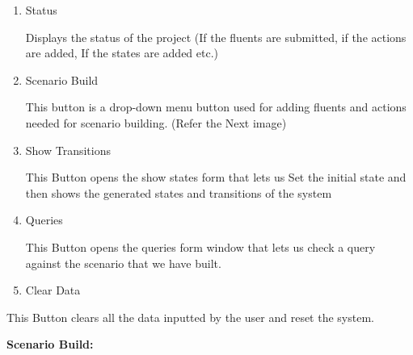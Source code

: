 \documentclass[12pt]{article}
\begin{document}
\vspace{\baselineskip}
\begin{enumerate}
	\item Status\par

\tab Displays the status of the project (If the fluents are submitted, if the actions are \tab added, If the states are added etc.)\par


\vspace{\baselineskip}
	\item Scenario Build\par

\tab This button is a drop-down menu button used for adding fluents and actions needed \tab for scenario building. (Refer the Next image)\par


\vspace{\baselineskip}
	\item Show Transitions\par

\tab This Button opens the show states form that lets us Set the initial state and then shows \tab the generated states and transitions of the system\par


\vspace{\baselineskip}
	\item Queries\par

\tab This Button opens the queries form window that lets us check a query against the \tab scenario that we have built.\par


\vspace{\baselineskip}
	\item Clear Data
\end{enumerate}\par

This Button clears all the data inputted by the user and reset the system.\par


\vspace{\baselineskip}

\vspace{\baselineskip}

\vspace{\baselineskip}
\textbf{Scenario Build:}\par


\vspace{\baselineskip}
\end{document}
